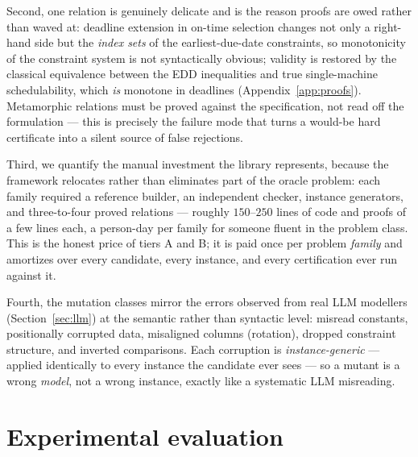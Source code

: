\documentclass[pdflatex,sn-mathphys-num]{sn-jnl}
\theoremstyle{thmstyleone}
\theoremstyle{thmstyletwo}
\begin{document}
Second, one relation is genuinely delicate and is the reason proofs
are owed rather than waved at: deadline extension in on-time
selection changes not only a right-hand side but the \emph{index
sets} of the earliest-due-date constraints, so monotonicity of the
constraint system is not syntactically obvious; validity is restored
by the classical equivalence between the EDD inequalities and true
single-machine schedulability, which \emph{is} monotone in deadlines
(Appendix~\ref{app:proofs}). Metamorphic relations must be proved
against the specification, not read off the formulation --- this is
precisely the failure mode that turns a would-be hard certificate
into a silent source of false rejections.

Third, we quantify the manual investment the library represents,
because the framework relocates rather than eliminates part of the
oracle problem: each family required a reference builder, an
independent checker, instance generators, and three-to-four proved
relations --- roughly $150$--$250$ lines of code and proofs of a few
lines each, a person-day per family for someone fluent in the
problem class. This is the honest price of tiers A and B; it is paid
once per problem \emph{family} and amortizes over every candidate,
every instance, and every certification ever run against it.

Fourth, the mutation classes mirror the errors observed from real LLM
modellers (Section~\ref{sec:llm}) at the semantic rather than
syntactic level: misread constants, positionally corrupted data,
misaligned columns (rotation), dropped constraint structure, and
inverted comparisons. Each corruption is \emph{instance-generic} ---
applied identically to every instance the candidate ever sees --- so
a mutant is a wrong \emph{model}, not a wrong instance, exactly like
a systematic LLM misreading.

\section{Experimental evaluation}\label{sec:experiments}
\end{document}
